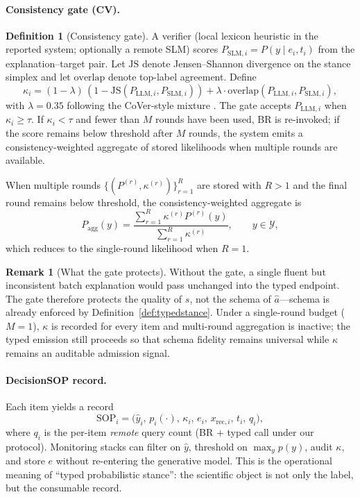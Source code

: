 \documentclass[10pt]{article}
\theoremstyle{definition}
\newtheorem{definition}{Definition}
\newtheorem{remark}{Remark}
\begin{document}
\paragraph{Consistency gate (CV).}
\begin{definition}[Consistency gate]
\label{def:gate}
A verifier (local lexicon heuristic in the reported system; optionally a remote SLM) scores $P_{\mathrm{SLM},i}=P(y\mid e_i,t_i)$ from the explanation--target pair.
Let $\mathrm{JS}$ denote Jensen--Shannon divergence on the stance simplex and let
$\mathrm{overlap}$ denote top-label agreement.
Define
\begin{equation}
\label{eq:kappa}
\kappa_i=(1-\lambda)\,(1-\mathrm{JS}(P_{\mathrm{LLM},i},P_{\mathrm{SLM},i}))
+\lambda\cdot\mathrm{overlap}(P_{\mathrm{LLM},i},P_{\mathrm{SLM},i}),
\end{equation}
with $\lambda{=}0.35$ following the CoVer-style mixture \cite{yan2025cover}.
The gate accepts $P_{\mathrm{LLM},i}$ when $\kappa_i\ge\tau$.
If $\kappa_i<\tau$ and fewer than $M$ rounds have been used, BR is re-invoked; if the score remains below
threshold after $M$ rounds, the system emits a consistency-weighted aggregate of stored likelihoods when
multiple rounds are available.
\end{definition}

When multiple rounds $\{(P^{(r)},\kappa^{(r)})\}_{r=1}^{R}$ are stored with $R>1$ and the final round remains
below threshold, the consistency-weighted aggregate is
\begin{equation}
\label{eq:agg}
P_{\mathrm{agg}}(y)=\frac{\sum_{r=1}^{R}\kappa^{(r)}P^{(r)}(y)}{\sum_{r=1}^{R}\kappa^{(r)}},\qquad y\in\mathcal{Y},
\end{equation}
which reduces to the single-round likelihood when $R{=}1$.

\begin{remark}[What the gate protects]
Without the gate, a single fluent but inconsistent batch explanation would pass unchanged into the typed
endpoint.
The gate therefore protects the quality of $s$, not the schema of $\hat{a}$---schema is already enforced by
Definition~\ref{def:typedstance}.
Under a single-round budget ($M{=}1$), $\kappa$ is recorded for every item and multi-round aggregation is
inactive; the typed emission still proceeds so that schema fidelity remains universal while $\kappa$ remains
an auditable admission signal.
\end{remark}

\paragraph{DecisionSOP record.}
Each item yields a record
\begin{equation}
\label{eq:sop}
\mathrm{SOP}_i=\bigl(\hat{y}_i,\,p_i(\cdot),\,\kappa_i,\,e_i,\,x_{\mathrm{rec},i},\,t_i,\,q_i\bigr),
\end{equation}
where $q_i$ is the per-item \emph{remote} query count (BR + typed call under our protocol).
Monitoring stacks can filter on $\hat{y}$, threshold on $\max_y p(y)$, audit $\kappa$, and store $e$ without
re-entering the generative model.
This is the operational meaning of ``typed probabilistic stance'': the scientific object is not only the
label, but the consumable record.
\end{document}
